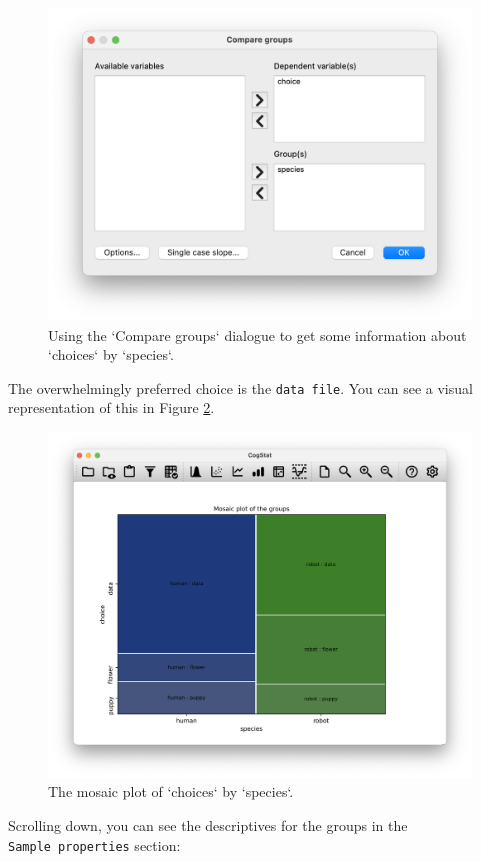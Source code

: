\documentclass[
]{book}
\theoremstyle{definition}
\theoremstyle{definition}
\theoremstyle{definition}
\theoremstyle{definition}
\theoremstyle{remark}
\begin{document}
\begin{figure}

{\centering \includegraphics[width=0.66\linewidth]{resources/image/cogstatcomparegroupschapek9} 

}

\caption{Using the `Compare groups` dialogue to get some information about `choices` by `species`.}\label{fig:cogstatchapek9}
\end{figure}

The overwhelmingly preferred choice is the \texttt{data\ file}. You can see a visual representation of this in Figure \ref{fig:cogstatchapek9mosaic}.

\begin{figure}

{\centering \includegraphics[width=0.66\linewidth]{resources/image/cogstatchapek9mosaic} 

}

\caption{The mosaic plot of `choices` by `species`.}\label{fig:cogstatchapek9mosaic}
\end{figure}

Scrolling down, you can see the descriptives for the groups in the \texttt{Sample\ properties} section:
\end{document}
